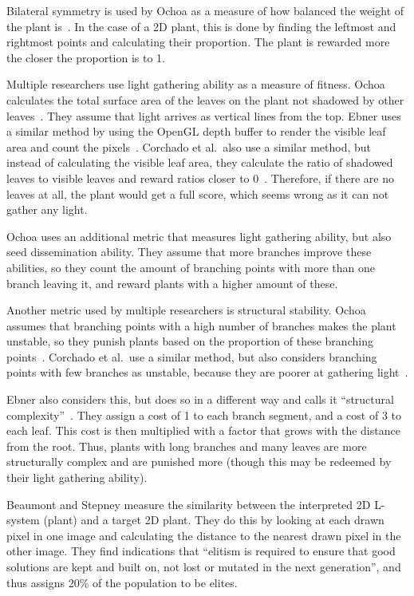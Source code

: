 Bilateral symmetry is used by Ochoa as a measure of how balanced the weight of the plant is~\cite{1998Ochoa}.
In the case of a 2D plant, this is done by finding the leftmost and rightmost points and calculating their proportion.
The plant is rewarded more the closer the proportion is to 1.

Multiple researchers use light gathering ability as a measure of fitness.
Ochoa calculates the total surface area of the leaves on the plant not shadowed by other leaves~\cite{1998Ochoa}.
They assume that light arrives as vertical lines from the top.
Ebner uses a similar method by using the OpenGL depth buffer to render the visible leaf area and count the pixels~\cite{2003Ebner}.
Corchado et al.\ also use a similar method, but instead of calculating the visible leaf area, they calculate the ratio of shadowed leaves to visible leaves and reward ratios closer to 0~\cite{2009Corchado}.
Therefore, if there are no leaves at all, the plant would get a full score, which seems wrong as it can not gather any light.

Ochoa uses an additional metric that measures light gathering ability, but also seed dissemination ability.
They assume that more branches improve these abilities, so they count the amount of branching points with more than one branch leaving it, and reward plants with a higher amount of these.~\cite{1998Ochoa}

Another metric used by multiple researchers is structural stability.
Ochoa assumes that branching points with a high number of branches makes the plant unstable, so they punish plants based on the proportion of these branching points~\cite{1998Ochoa}.
Corchado et al.\ use a similar method, but also considers branching points with few branches as unstable, because they are poorer at gathering light~\cite{2009Corchado}.

Ebner also considers this, but does so in a different way and calls it ``structural complexity''~\cite{2003Ebner}.
They assign a cost of 1 to each branch segment, and a cost of 3 to each leaf.
This cost is then multiplied with a factor that grows with the distance from the root.
Thus, plants with long branches and many leaves are more structurally complex and are punished more (though this may be redeemed by their light gathering ability).

Beaumont and Stepney measure the similarity between the interpreted 2D \gls{L-system} (plant) and a target 2D plant.
They do this by looking at each drawn pixel in one image and calculating the distance to the nearest drawn pixel in the other image.
They find indications that ``elitism is required to ensure that good solutions are kept and built on, not lost or mutated in the next generation'', and thus assigns 20\% of the population to be elites.~\cite{2009Beaumont}

